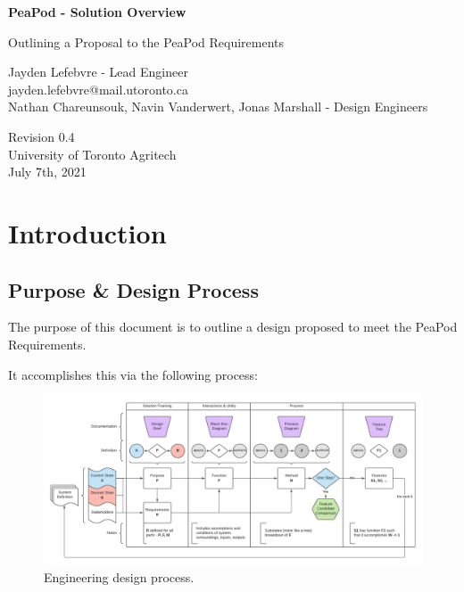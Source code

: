 \documentclass{report}
\begin{document}
\begin{titlepage}
    \begin{center}
        \vspace*{1.2cm}

        \textbf{\large{PeaPod - Solution Overview}}

        \vspace{0.5cm}

        Outlining a Proposal to the PeaPod Requirements

        \vfill

        Jayden Lefebvre - Lead Engineer\\\small{jayden.lefebvre@mail.utoronto.ca}\\
        \vspace{1cm}
        Nathan Chareunsouk, Navin Vanderwert, Jonas Marshall - Design Engineers

        \vspace{2.5cm}

        Revision 0.4\\
        University of Toronto Agritech\\
        July 7th, 2021

    \end{center}
\end{titlepage}

\thispagestyle{plain}

\tableofcontents
\newpage

\section{Introduction}
\label{sec:intro}

\subsection{Purpose \& Design Process}
\label{sec:purpose}

The purpose of this document is to outline a design proposed to meet the PeaPod Requirements.

It accomplishes this via the following process:

\begin{figure}[h]
    \centering
    \includegraphics[width=17cm]{images/designprocess.png}
    \hfill
    \caption{Engineering design process.}
\end{figure}
\end{document}
